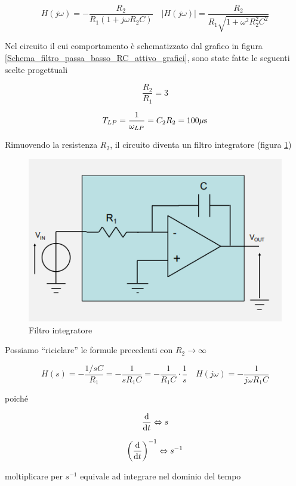 \documentclass{article}
\begin{document}
\[H(j \omega) = - \frac{R_2}{R_1 (1 + j \omega R_2 C)} \quad |H(j \omega)| = \frac{R_2}{R_1 \sqrt{1 + \omega ^2 R^2_2 C^2}}\]

Nel circuito il cui comportamento è schematizzato dal grafico in figura \ref{Schema_filtro_passa_basso_RC_attivo_grafici}, sono state fatte le seguenti scelte progettuali

\[\frac{R_2}{R_1} = 3\]

\[T_{LP} = \frac{1}{\omega _{LP}} = C_2 R_2 = 100 \mu \textrm s\]

\clearpage
Rimuovendo la resistenza $R_2$, il circuito diventa un filtro integratore (figura \ref{Schema_filtro_integratore})

\begin{figure}[h]
  \centering
  \includegraphics[scale=0.6]{IM_filtro_integratore}
  \caption{Filtro integratore}
  \label{Schema_filtro_integratore}
\end{figure}

Possiamo ``riciclare'' le formule precedenti con $R_2 \rightarrow \infty$

\[H(s) = - \frac{1/sC}{R_1} = - \frac{1}{sR_1 C} = - \frac{1}{R_1 C} \cdot \frac{1}{s} \quad H(j \omega) = - \frac{1}{j \omega R_1 C}\]

poiché

\[\frac{\textrm d}{\textrm d t} \Leftrightarrow s\]

\[\left( \frac{\textrm d}{\textrm d t} \right)^{-1} \Leftrightarrow s ^{-1}\]

moltiplicare per $s^{-1}$ equivale ad integrare nel dominio del tempo
\end{document}

